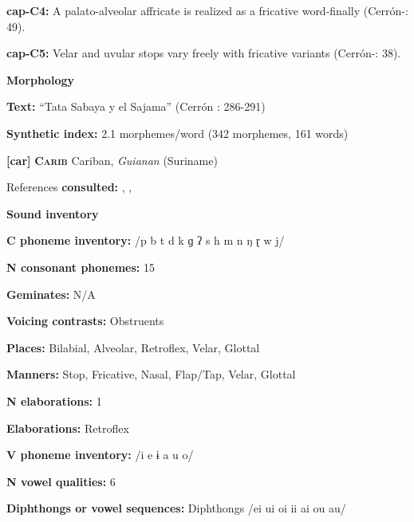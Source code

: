 \textbf{cap-C4:} A palato-alveolar affricate is realized as a fricative word-finally (Cerrón-\citealt{Palomino2006}: 49).



\textbf{cap-C5:} Velar and uvular stops vary freely with fricative variants (Cerrón-\citealt{Palomino2006}: 38).



\textbf{Morphology}



\textbf{Text:} “Tata Sabaya y el Sajama” (Cerrón \citealt{Palomino2006}: 286-291)



\textbf{Synthetic index:} 2.1 morphemes/word (342 morphemes, 161 words)



\textbf{[car]}   \textbf{\textsc{Carib}  }  Cariban, \textit{Guianan} (Suriname)



References \textbf{consulted:} \citet{Courtz2008}, \citet{Hoff1968}, \citet{Peasgood1972}



\textbf{Sound inventory}



\textbf{C phoneme inventory:} /p b t d k ɡ ʔ s h m n ŋ ɽ w j/



\textbf{N consonant phonemes:} 15



\textbf{Geminates:} N/A



\textbf{Voicing contrasts:} Obstruents



\textbf{Places:} Bilabial, Alveolar, Retroflex, Velar, Glottal



\textbf{Manners:} Stop, Fricative, Nasal, Flap/Tap, Velar, Glottal



\textbf{N elaborations:} 1



\textbf{Elaborations:} Retroflex



\textbf{V phoneme inventory:} /i e ɨ a u o/



\textbf{N vowel qualities:} 6



\textbf{Diphthongs or vowel sequences:} Diphthongs /ei ui oi ii ai ou au/



